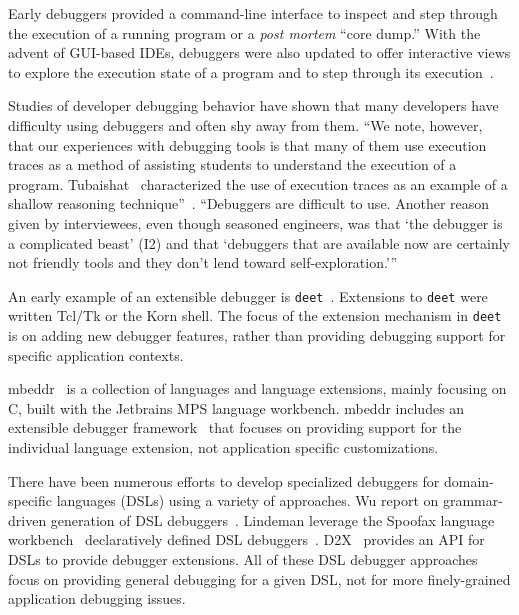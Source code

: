 \documentclass[sigplan,anonymous,review,10pt]{acmart}
\newcommand\deet{{\tt deet}\xspace}
\begin{document}
Early debuggers provided a command-line interface to inspect and step through the execution of a running program or a \emph{post mortem} ``core dump.''
With the advent of GUI-based IDEs, debuggers were also updated to offer interactive views to explore the execution state of a program and to step through its execution~\cite{Rose96a}.


Studies of developer debugging behavior have shown that many developers have difficulty using debuggers and often shy away from them.
``We note, however, that our experiences with debugging tools is that many of them use execution traces as a method of assisting students to understand the execution of a program. Tubaishat~\cite{Tuba01a} characterized the use of execution traces as an example of a shallow reasoning technique''~\cite{McCa08a}.
``Debuggers are difficult to use. Another reason given by interviewees, even though seasoned engineers, was that `the debugger is a complicated beast' (I2) and that `debuggers that are available now are certainly not friendly tools and they don't lend toward self-exploration.'''
\cite{Bell18a}

An early example of an extensible debugger is \deet~\cite{Hans97a}.
Extensions to \deet were written Tcl/Tk or the Korn shell.
The focus of the extension mechanism in \deet is on adding new debugger features, rather than providing debugging support for specific application contexts.

mbeddr~\cite{Voel17a} is a collection of languages and language extensions, mainly focusing on C, built with the Jetbrains MPS language workbench.
mbeddr includes an extensible debugger framework~\cite{Pavl15a} that focuses on providing support for the individual language extension, not application specific customizations.

There have been numerous efforts to develop specialized debuggers for domain-specific languages (DSLs) using a variety of approaches.
Wu \etal report on grammar-driven generation of DSL debuggers~\cite{HuiW08a}.
Lindeman \etal leverage the Spoofax language workbench~\cite{Kats10a} declaratively defined DSL debuggers~\cite{Lind11a}.
D2X~\cite{Brah23a} provides an API for DSLs to provide debugger extensions.
All of these DSL debugger approaches focus on providing general debugging for a given DSL, not for more finely-grained application debugging issues.
\end{document}
